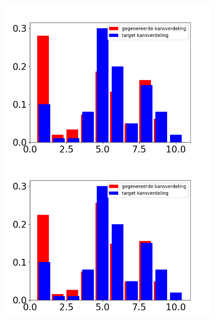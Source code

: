 \begin{figure}
\begin{minipage}{0.49\linewidth}
        \includegraphics[width=\linewidth]{Figures/goede_visualisatie_3/visualisatie_360.png} 
    \end{minipage}
    \hfill
    \begin{minipage}{0.49\linewidth}
        \includegraphics[width=\linewidth]{Figures/goede_visualisatie_3/visualisatie_450.png}
    \end{minipage}
    \begin{minipage}{0.49\linewidth}

\end{minipage}
\end{figure}
